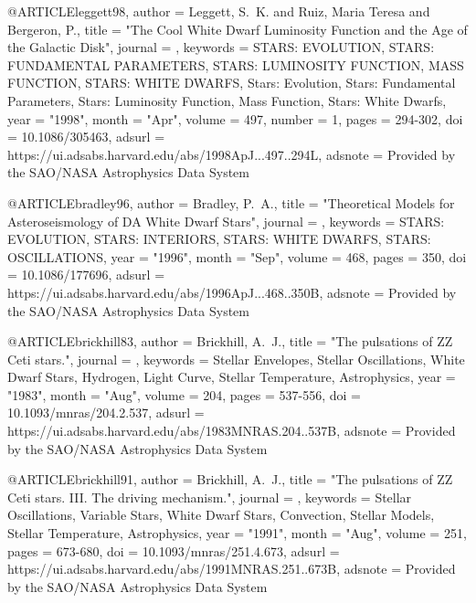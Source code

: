 \documentclass[a4paper,fleqn,usenatbib]{mnras}
\begin{document}
{{{{{{{{{{{@ARTICLE{leggett98,
       author = {{Leggett}, S.~K. and {Ruiz}, Maria Teresa and {Bergeron}, P.},
        title = "{The Cool White Dwarf Luminosity Function and the Age of the Galactic Disk}",
      journal = {\apj},
     keywords = {STARS: EVOLUTION, STARS: FUNDAMENTAL PARAMETERS, STARS: LUMINOSITY FUNCTION, MASS FUNCTION, STARS: WHITE DWARFS, Stars: Evolution, Stars: Fundamental Parameters, Stars: Luminosity Function, Mass Function, Stars: White Dwarfs},
         year = "1998",
        month = "Apr",
       volume = {497},
       number = {1},
        pages = {294-302},
          doi = {10.1086/305463},
       adsurl = {https://ui.adsabs.harvard.edu/abs/1998ApJ...497..294L},
      adsnote = {Provided by the SAO/NASA Astrophysics Data System}
}

@ARTICLE{bradley96,
       author = {{Bradley}, P.~A.},
        title = "{Theoretical Models for Asteroseismology of DA White Dwarf Stars}",
      journal = {\apj},
     keywords = {STARS: EVOLUTION, STARS: INTERIORS, STARS: WHITE DWARFS, STARS: OSCILLATIONS},
         year = "1996",
        month = "Sep",
       volume = {468},
        pages = {350},
          doi = {10.1086/177696},
       adsurl = {https://ui.adsabs.harvard.edu/abs/1996ApJ...468..350B},
      adsnote = {Provided by the SAO/NASA Astrophysics Data System}
}

@ARTICLE{brickhill83,
       author = {{Brickhill}, A.~J.},
        title = "{The pulsations of ZZ Ceti stars.}",
      journal = {\mnras},
     keywords = {Stellar Envelopes, Stellar Oscillations, White Dwarf Stars, Hydrogen, Light Curve, Stellar Temperature, Astrophysics},
         year = "1983",
        month = "Aug",
       volume = {204},
        pages = {537-556},
          doi = {10.1093/mnras/204.2.537},
       adsurl = {https://ui.adsabs.harvard.edu/abs/1983MNRAS.204..537B},
      adsnote = {Provided by the SAO/NASA Astrophysics Data System}
}

@ARTICLE{brickhill91,
       author = {{Brickhill}, A.~J.},
        title = "{The pulsations of ZZ Ceti stars. III. The driving mechanism.}",
      journal = {\mnras},
     keywords = {Stellar Oscillations, Variable Stars, White Dwarf Stars, Convection, Stellar Models, Stellar Temperature, Astrophysics},
         year = "1991",
        month = "Aug",
       volume = {251},
        pages = {673-680},
          doi = {10.1093/mnras/251.4.673},
       adsurl = {https://ui.adsabs.harvard.edu/abs/1991MNRAS.251..673B},
      adsnote = {Provided by the SAO/NASA Astrophysics Data System}
}

}}}}}}}}}}}
\end{document}
